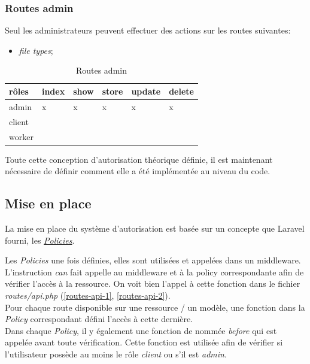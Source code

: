 \documentclass[
    iai, %
    il, %
]{heig-tb}
\begin{document}
\subsubsection{Routes admin}
Seul les administrateurs peuvent effectuer des actions sur les routes suivantes:

\begin{itemize}
    \item \emph{file types};
\end{itemize}

\begin{table}[h]
    \begin{center}
        \caption{Routes admin \label{autorisations-route-admin}}
        \begin{tabularx}{1.0\textwidth} {X|X|X|X|X|X}
            rôles  & index & show & store & update & delete \\ \hline
            admin  & x     & x    & x     & x      & x      \\
            client &       &      &       &        &        \\
            worker &       &      &       &        &        \\
        \end{tabularx}
    \end{center}
\end{table}

Toute cette conception d'autorisation théorique définie, il est maintenant nécessaire de définir comment elle a été implémentée au niveau du code.

\subsection{Mise en place}
La mise en place du système d'autorisation est basée sur un concepte que Laravel fourni, les \href{https://laravel.com/docs/9.x/authorization#creating-policies}{\emph{Policies}}.

Les \emph{Policies} une fois définies, elles sont utilisées et appelées dans un middleware. L'instruction \emph{can} fait appelle au middleware et à la policy correspondante afin de vérifier l'accès à la ressource. On voit bien l'appel à cette fonction dans le fichier \emph{routes/api.php} (\ref{routes-api-1}, \ref{routes-api-2}). \\
Pour chaque route disponible sur une ressource / un modèle, une fonction dans la \emph{Policy} correspondant défini l'accès à cette dernière. \\
Dans chaque \emph{Policy}, il y également une fonction de nommée \emph{before} qui est appelée avant toute vérification. Cette fonction est utilisée afin de vérifier si l'utilisateur possède au moins le rôle \emph{client} ou s'il est \emph{admin}.
\end{document}

